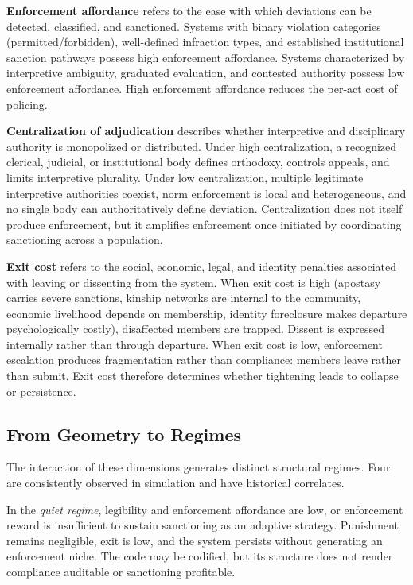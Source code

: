 \documentclass[12pt]{article}
\begin{document}
\textbf{Enforcement affordance} refers to the ease with which deviations can be detected, classified, and sanctioned. Systems with binary violation categories (permitted/forbidden), well-defined infraction types, and established institutional sanction pathways possess high enforcement affordance. Systems characterized by interpretive ambiguity, graduated evaluation, and contested authority possess low enforcement affordance. High enforcement affordance reduces the per-act cost of policing.

\textbf{Centralization of adjudication} describes whether interpretive and disciplinary authority is monopolized or distributed. Under high centralization, a recognized clerical, judicial, or institutional body defines orthodoxy, controls appeals, and limits interpretive plurality. Under low centralization, multiple legitimate interpretive authorities coexist, norm enforcement is local and heterogeneous, and no single body can authoritatively define deviation. Centralization does not itself produce enforcement, but it amplifies enforcement once initiated by coordinating sanctioning across a population.

\textbf{Exit cost} refers to the social, economic, legal, and identity penalties associated with leaving or dissenting from the system. When exit cost is high (apostasy carries severe sanctions, kinship networks are internal to the community, economic livelihood depends on membership, identity foreclosure makes departure psychologically costly), disaffected members are trapped. Dissent is expressed internally rather than through departure. When exit cost is low, enforcement escalation produces fragmentation rather than compliance: members leave rather than submit. Exit cost therefore determines whether tightening leads to collapse or persistence.

\subsection{From Geometry to Regimes}

The interaction of these dimensions generates distinct structural regimes. Four are consistently observed in simulation and have historical correlates.

In the \textit{quiet regime}, legibility and enforcement affordance are low, or enforcement reward is insufficient to sustain sanctioning as an adaptive strategy. Punishment remains negligible, exit is low, and the system persists without generating an enforcement niche. The code may be codified, but its structure does not render compliance auditable or sanctioning profitable.
\end{document}
